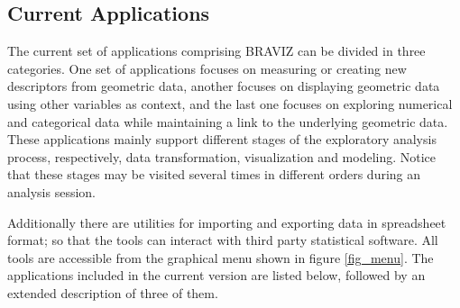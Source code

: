 \documentclass[utf8,paper]{frontiersSCNS} %
\begin{document}
\subsection{Current Applications}


The current set of applications comprising BRAVIZ can be divided in three categories. One set of applications focuses on measuring or creating new descriptors from geometric data, another focuses on displaying geometric data using other variables as context, and the last one focuses on exploring numerical and categorical data while maintaining a link to the underlying geometric data. These applications mainly support different stages of the exploratory analysis process, respectively, data transformation, visualization and modeling. Notice that these stages may be visited several times in different orders during an analysis session.

Additionally there are utilities for importing and exporting data in spreadsheet format; so that the tools can interact with third party statistical software. All tools are accessible from the graphical menu shown in figure \ref{fig_menu}. The applications included in the current version are listed below, followed by an extended description of three of them.
\end{document}
